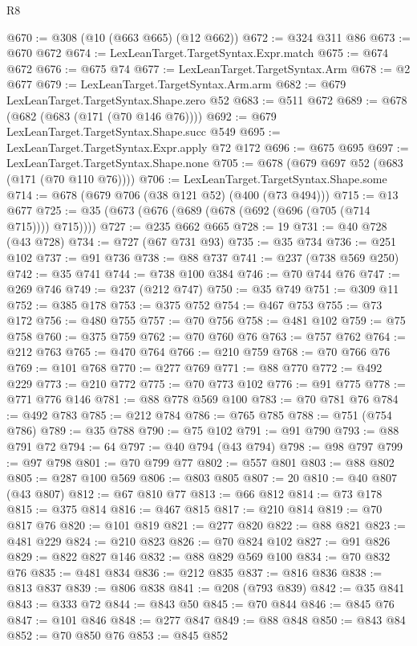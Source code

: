 \begin{lexlean}{R8}
\begin{coremodule}
@670 := @308 (@10 (@663 @665) (@12 @662))
@672 := @324 @311 @86
@673 := @670 @672
@674 := LexLeanTarget.TargetSyntax.Expr.match
@675 := @674 @672
@676 := @675 @74
@677 := LexLeanTarget.TargetSyntax.Arm
@678 := @2 @677
@679 := LexLeanTarget.TargetSyntax.Arm.arm
@682 := @679 LexLeanTarget.TargetSyntax.Shape.zero @52
@683 := @511 @672
@689 := @678 (@682 (@683 (@171 (@70 @146 @76))))
@692 := @679 LexLeanTarget.TargetSyntax.Shape.succ @549
@695 := LexLeanTarget.TargetSyntax.Expr.apply @72 @172
@696 := @675 @695
@697 := LexLeanTarget.TargetSyntax.Shape.none
@705 := @678 (@679 @697 @52 (@683 (@171 (@70 @110 @76))))
@706 := LexLeanTarget.TargetSyntax.Shape.some
@714 := @678 (@679 @706 (@38 @121 @52) (@400 (@73 @494)))
@715 := @13 @677
@725 := @35 (@673 (@676 (@689 (@678 (@692 (@696 (@705 (@714 @715)))) @715))))
@727 := @235 @662 @665
@728 := 19
@731 := @40 @728 (@43 @728)
@734 := @727 (@67 @731 @93)
@735 := @35 @734
@736 := @251 @102
@737 := @91 @736
@738 := @88 @737
@741 := @237 (@738 @569 @250)
@742 := @35 @741
@744 := @738 @100 @384
@746 := @70 @744 @76
@747 := @269 @746
@749 := @237 (@212 @747)
@750 := @35 @749
@751 := @309 @11
@752 := @385 @178
@753 := @375 @752
@754 := @467 @753
@755 := @73 @172
@756 := @480 @755
@757 := @70 @756
@758 := @481 @102
@759 := @75 @758
@760 := @375 @759
@762 := @70 @760 @76
@763 := @757 @762
@764 := @212 @763
@765 := @470 @764
@766 := @210 @759
@768 := @70 @766 @76
@769 := @101 @768
@770 := @277 @769
@771 := @88 @770
@772 := @492 @229
@773 := @210 @772
@775 := @70 @773 @102
@776 := @91 @775
@778 := @771 @776 @146
@781 := @88 @778 @569 @100
@783 := @70 @781 @76
@784 := @492 @783
@785 := @212 @784
@786 := @765 @785
@788 := @751 (@754 @786)
@789 := @35 @788
@790 := @75 @102
@791 := @91 @790
@793 := @88 @791 @72
@794 := 64
@797 := @40 @794 (@43 @794)
@798 := @98 @797
@799 := @97 @798
@801 := @70 @799 @77
@802 := @557 @801
@803 := @88 @802
@805 := @287 @100 @569
@806 := @803 @805
@807 := 20
@810 := @40 @807 (@43 @807)
@812 := @67 @810 @77
@813 := @66 @812
@814 := @73 @178
@815 := @375 @814
@816 := @467 @815
@817 := @210 @814
@819 := @70 @817 @76
@820 := @101 @819
@821 := @277 @820
@822 := @88 @821
@823 := @481 @229
@824 := @210 @823
@826 := @70 @824 @102
@827 := @91 @826
@829 := @822 @827 @146
@832 := @88 @829 @569 @100
@834 := @70 @832 @76
@835 := @481 @834
@836 := @212 @835
@837 := @816 @836
@838 := @813 @837
@839 := @806 @838
@841 := @208 (@793 @839)
@842 := @35 @841
@843 := @333 @72
@844 := @843 @50
@845 := @70 @844
@846 := @845 @76
@847 := @101 @846
@848 := @277 @847
@849 := @88 @848
@850 := @843 @84
@852 := @70 @850 @76
@853 := @845 @852

\end{coremodule}
\end{lexlean}
